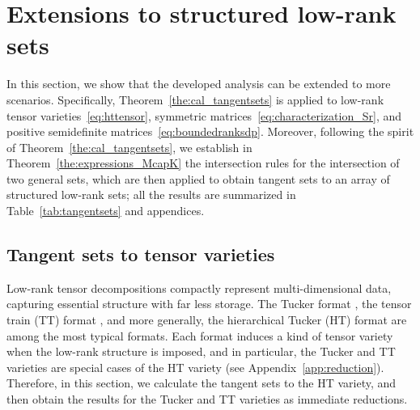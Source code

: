 \section{Extensions to structured low-rank sets}\label{sec:extent_structured}
In this section, we show that the developed analysis can be extended to more scenarios. Specifically, Theorem~\ref{the:cal_tangentsets} is applied to low-rank tensor varieties~\eqref{eq:httensor}, symmetric matrices~\eqref{eq:characterization_Sr}, and positive semidefinite matrices~\eqref{eq:boundedranksdp}. Moreover, following the spirit of Theorem~\ref{the:cal_tangentsets}, we establish in Theorem~\ref{the:expressions_McapK} the intersection rules for the intersection of two general sets, which are then applied to obtain tangent sets to an array of structured low-rank sets; all the results are summarized in Table~\ref{tab:tangentsets} and appendices.

\subsection{Tangent sets to tensor varieties}
Low-rank tensor decompositions compactly represent multi-dimensional data, capturing essential structure with far less storage. The Tucker format \cite{tucker1964extension}, the tensor train (TT) format \cite{oseledets2011TTSVD}, and more generally, the hierarchical Tucker (HT) format \cite{grasedyck2010hierarchicalSVD} are among the most typical formats. Each format induces a kind of tensor variety when the low-rank structure is imposed, and in particular, the Tucker and TT varieties are special cases of the HT variety (see Appendix~\ref{app:reduction}). Therefore, in this section, we calculate the tangent sets to the HT variety, and then obtain the results for the Tucker and TT varieties as immediate reductions.

